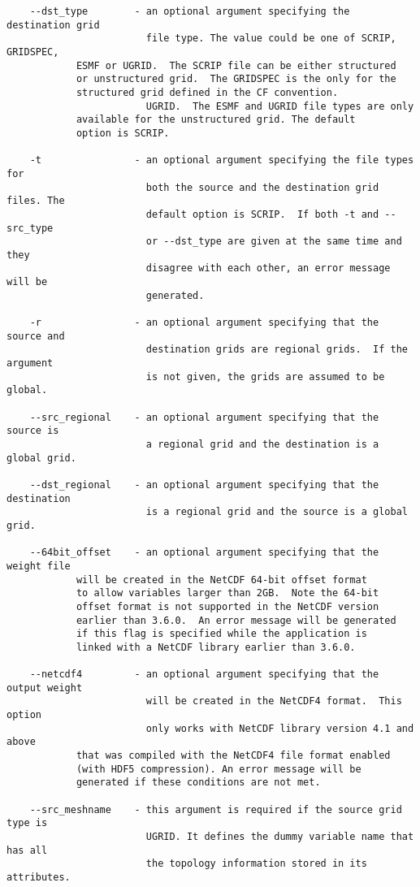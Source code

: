 \begin{verbatim}
    --dst_type        - an optional argument specifying the destination grid
                        file type. The value could be one of SCRIP, GRIDSPEC,
			ESMF or UGRID.  The SCRIP file can be either structured
 			or unstructured grid.  The GRIDSPEC is the only for the
			structured grid defined in the CF convention.
                        UGRID.  The ESMF and UGRID file types are only
			available for the unstructured grid. The default
			option is SCRIP.

    -t                - an optional argument specifying the file types for
                        both the source and the destination grid files. The
                        default option is SCRIP.  If both -t and --src_type
                        or --dst_type are given at the same time and they
                        disagree with each other, an error message will be
                        generated.

    -r                - an optional argument specifying that the source and
                        destination grids are regional grids.  If the argument
                        is not given, the grids are assumed to be global.

    --src_regional    - an optional argument specifying that the source is
                        a regional grid and the destination is a global grid.

    --dst_regional    - an optional argument specifying that the destination
                        is a regional grid and the source is a global grid.

    --64bit_offset    - an optional argument specifying that the weight file
			will be created in the NetCDF 64-bit offset format
			to allow variables larger than 2GB.  Note the 64-bit
			offset format is not supported in the NetCDF version
			earlier than 3.6.0.  An error message will be generated
			if this flag is specified while the application is
			linked with a NetCDF library earlier than 3.6.0.

    --netcdf4         - an optional argument specifying that the output weight
                        will be created in the NetCDF4 format.  This option 
                        only works with NetCDF library version 4.1 and above 
			that was compiled with the NetCDF4 file format enabled 
			(with HDF5 compression). An error message will be 
			generated if these conditions are not met.

    --src_meshname    - this argument is required if the source grid type is
                        UGRID. It defines the dummy variable name that has all
                        the topology information stored in its attributes.


\end{verbatim}
